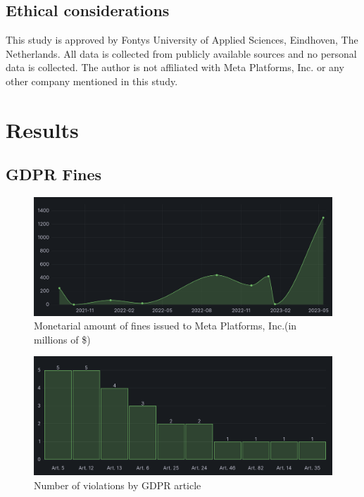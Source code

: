 \documentclass[12pt, a4paper]{article}
\begin{document}
\subsection*{Ethical considerations}

This study is approved by Fontys University of Applied Sciences, Eindhoven, The
Netherlands. All data is collected from publicly available sources and no
personal data is collected. The author is not affiliated with Meta Platforms,
Inc. or any other company mentioned in this study.

\section*{Results}

\subsection*{GDPR Fines}

\begin{figure}[H]
    \centering
    \includegraphics[width=1.00\textwidth]{monetarial-amount-of-gdpr-fines}
    \caption{Monetarial amount of fines issued to Meta Platforms, Inc.(in
    millions of
    \$)\cite{gdprFine1,gdprFine2,gdprFine3,gdprFine4,gdprFine5,gdprFine6,gdprFine7,gdprFine8,gdprFine9}}
    \label{fig:amount-of-gdpr-fines}
\end{figure}

\begin{figure}[H]
    \centering
    \includegraphics[width=1.00\textwidth]{violations-by-article}
    \caption{Number of violations by GDPR
    article\cite{gdprFine1,gdprFine2,gdprFine3,gdprFine4,gdprFine5,gdprFine6,gdprFine7,gdprFine8,gdprFine9}}
    \label{fig:violations-by-article}
\end{figure}
\end{document}
